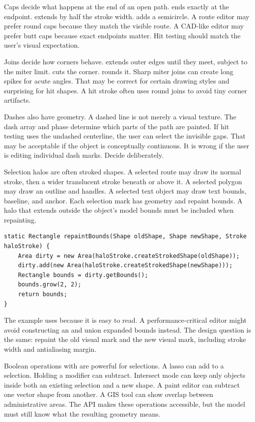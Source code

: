 Caps decide what happens at the end of an open path.  ends exactly at the endpoint.  extends by half the stroke width.  adds a semicircle. A route editor may prefer round caps because they match the visible route. A CAD-like editor may prefer butt caps because exact endpoints matter. Hit testing should match the user's visual expectation.

Joins decide how corners behave.  extends outer edges until they meet, subject to the miter limit.  cuts the corner.  rounds it. Sharp miter joins can create long spikes for acute angles. That may be correct for certain drawing styles and surprising for hit shapes. A hit stroke often uses round joins to avoid tiny corner artifacts.

Dashes also have geometry. A dashed line is not merely a visual texture. The dash array and phase determine which parts of the path are painted. If hit testing uses the undashed centerline, the user can select the invisible gaps. That may be acceptable if the object is conceptually continuous. It is wrong if the user is editing individual dash marks. Decide deliberately.

Selection halos are often stroked shapes. A selected route may draw its normal stroke, then a wider translucent stroke beneath or above it. A selected polygon may draw an outline and handles. A selected text object may draw text bounds, baseline, and anchor. Each selection mark has geometry and repaint bounds. A halo that extends outside the object's model bounds must be included when repainting.

\begin{lstlisting}[caption={Computing repaint bounds for old and new selection halos.}]
static Rectangle repaintBounds(Shape oldShape, Shape newShape, Stroke haloStroke) {
    Area dirty = new Area(haloStroke.createStrokedShape(oldShape));
    dirty.add(new Area(haloStroke.createStrokedShape(newShape)));
    Rectangle bounds = dirty.getBounds();
    bounds.grow(2, 2);
    return bounds;
}
\end{lstlisting}

The example uses  because it is easy to read. A performance-critical editor might avoid constructing an  and union expanded bounds instead. The design question is the same: repaint the old visual mark and the new visual mark, including stroke width and antialiasing margin.

Boolean operations with  are powerful for selections. A lasso can add to a selection. Holding a modifier can subtract. Intersect mode can keep only objects inside both an existing selection and a new shape. A paint editor can subtract one vector shape from another. A GIS tool can show overlap between administrative areas. The API makes these operations accessible, but the model must still know what the resulting geometry means.

